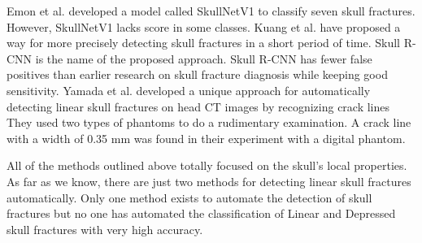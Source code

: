 \documentclass[sigconf]{acmart}
\begin{document}
Emon et al.\cite{Emon_2022} developed a model called SkullNetV1 to classify seven skull fractures. However, SkullNetV1 lacks score in some classes. Kuang et al.\cite{kuang2020skull} have proposed a way for more precisely detecting skull fractures in a short period of time. Skull R-CNN is the name of the proposed approach. Skull R-CNN has fewer false positives than earlier research on skull fracture diagnosis while keeping good sensitivity. Yamada et al.\cite{yamada2016preliminary} developed a unique approach for automatically detecting linear skull fractures on head CT images by recognizing crack lines They used two types of phantoms to do a rudimentary examination. A crack line with a width of 0.35 mm was found in their experiment with a digital phantom.  

All of the methods outlined above totally focused on the skull's local properties. As far as we know, there are just two methods for detecting linear skull fractures automatically. Only one method exists to automate the detection of skull fractures but no one has automated the classification of Linear and Depressed skull fractures with very high accuracy.
\end{document}
